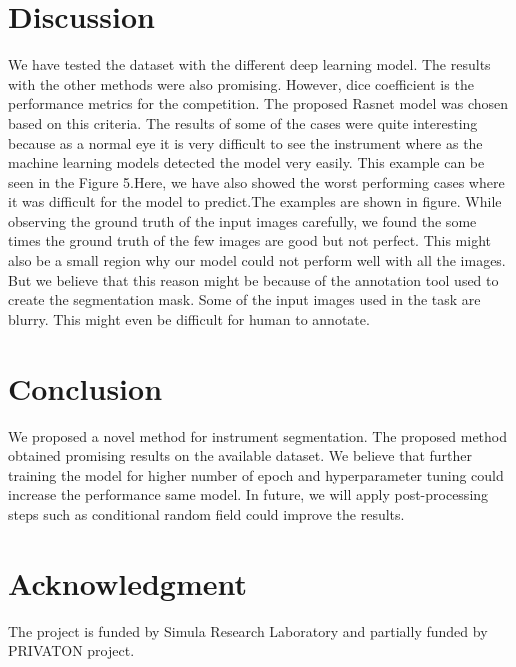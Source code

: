 \documentclass[conference]{IEEEtran}
\begin{document}
\section{Discussion}
We have tested the dataset with the different deep learning model. The results with the other methods were also promising. However, dice coefficient is the performance metrics for the competition. The proposed Rasnet model was chosen based on this criteria. The results of some of the cases were quite interesting because as a normal eye it is very difficult to see the instrument where as the machine learning models detected the model very easily. This example can be seen in the Figure 5.Here, we have also showed the worst performing cases where it was difficult for the model to predict.The examples are shown in figure. While observing the ground truth of the input images carefully, we found the some times the ground truth of the few images are good but not perfect. This might also be a small region why our model could not perform well with all the images. But we believe that this reason might be because of the annotation tool used to create the segmentation mask.  Some  of the input images used in the task are blurry. This might even be difficult for human to annotate. 

\section{Conclusion}
We proposed a novel method for instrument segmentation. The proposed method obtained promising results on the available dataset. We believe that further training the model for higher number of epoch and hyperparameter tuning could increase the performance same model. In future, we will apply post-processing steps  such as conditional random field could improve the results. 
\section*{Acknowledgment}
The project is funded by Simula Research Laboratory and partially funded by PRIVATON project. 


 
\end{document}
